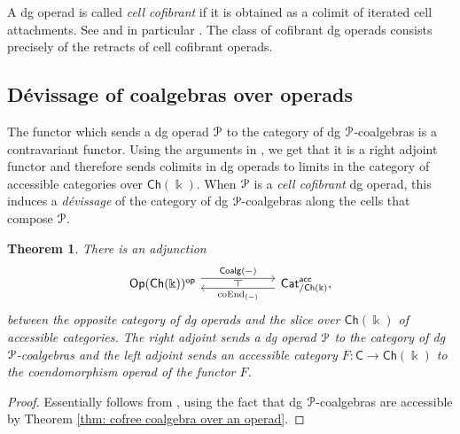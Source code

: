\documentclass{proc-l}
\renewcommand{\mathcal}{\EuScript}
\theoremstyle{plain}
\newtheorem{theorem}{Theorem}[section]
\theoremstyle{definition}
\theoremstyle{remark}
\newcommand{\kk}{\Bbbk}
\begin{document}
A dg operad is called \textit{cell cofibrant} if it is obtained as a colimit of iterated cell attachments. See \cite[Section 12.2.1]{Fresse09} and in particular \cite[Proposition 12.2.3]{Fresse09}. The class of cofibrant dg operads consists precisely of the retracts of cell cofibrant operads.

\subsection{D{\'{e}}vissage of coalgebras over operads}%
\label{Section:2.6}
The functor which sends a dg operad $\mathcal{P}$ to the category of dg $\mathcal{P}$-coalgebras is a contravariant functor. Using the arguments in \cite{DrummondColeHirshLejay20}, we get that it is a right adjoint functor and therefore sends colimits in dg operads to limits in the category of accessible categories over $\mathsf{Ch}(\kk)$. When $\mathcal{P}$ is a \textit{cell cofibrant} dg operad, this induces a \textit{d{\'{e}}vissage} of the category of dg $\mathcal{P}$-coalgebras along the cells that compose $\mathcal{P}$.

\begin{theorem}%
\label{Theorem:2.16}\label{thm: 1-categorical adjunction between categories of coalgebras and coendomorphism operads}
There is an adjunction
\[
\begin{tikzcd}[column sep=5pc,row sep=3pc]
\mathsf{Op}(\mathsf{Ch}(\kk))^{\mathsf{op}} \arrow[r, shift left=1.1ex, "\mathsf{Coalg}(-)"{name=F}] &\mathsf{Cat}^{\mathsf{acc}}_{/\mathsf{Ch}(\kk)}, \arrow[l, shift left=.75ex, "\mathrm{coEnd}_{(-)}"{name=U}]
\arrow[phantom, from=F, to=U, , "\dashv" rotate=90]
\end{tikzcd}
\]
between the opposite category of dg operads and the slice over $\mathsf{Ch}(\kk)$ of accessible categories. The right adjoint sends a dg operad $\mathcal{P}$ to the category of dg $\mathcal{P}$-coalgebras and the left adjoint sends an accessible category $F: \mathsf{C} \longrightarrow \mathsf{Ch}(\kk)$ to the coendomorphism operad of the functor $F$.
\end{theorem}

\begin{proof}
Essentially follows from \cite[Section B.1.3]{DrummondColeHirshLejay20}, using the fact that dg $\mathcal{P}$-coalgebras are accessible by Theorem \ref{thm: cofree coalgebra over an operad}.
\end{proof}
\end{document}
